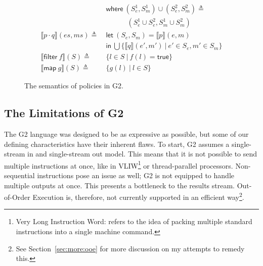 \documentclass[sigconf,usenames,dvipsnames,svgnames,table]{acmart}
\newcommand{\interp}[1]{\llbracket #1 \rrbracket}
\def \sysname {\textsc{G2}\xspace}
\begin{document}
\begin{figure}
{\begin{align*}
              &\mathsf{where}\ (S_e^1, S_m^1)\cup (S_e^2, S_m^2)\triangleq\\
              &\quad\quad\quad (S_e^1\cup S_e^2, S_m^1\cup S_m^2)\\
            \interp { p \cdot q }(es, ms)
              \triangleq\ &
              \mathsf{let}\ (S_e, S_m) = \interp{p}(e, m)\\
              &\mathsf{in}\ \bigcup \{\interp{q}(e',m')\ |\ e'\in S_e, m'\in S_m\}\\
              \hline
            \interp{\mathsf{filter}\ f}(S)
              \triangleq\ & \{l \in S\ |\ f(l) = \mathsf{true}\}\\
            \interp{\mathsf{map}\ g}(S)
              \triangleq\ &
              \{ g(l)\ |\ l\in S \} 
          \end{align*}}
          \caption{The semantics of policies in \sysname.}
          \label{fig:spec:sem:pol}
        \end{figure}

    \subsection{The Limitations of \sysname}\label{sec:spec:lim}
      The \sysname language was designed to be as expressive as possible, but some of our defining characteristics have their inherent flaws.
      To start, \sysname assumes a single-stream in and single-stream out model.
      This means that it is not possible to send multiple instructions at once, like in VLIW\footnote{
      Very Long Instruction Word: refers to the idea of packing multiple standard instructions into a single machine command.} or thread-parallel processors.
      Non-sequential instructions pose an issue as well; \sysname is not equipped to handle multiple outputs at once.
      This presents a bottleneck to the results stream.
      Out-of-Order Execution is, therefore, not currently supported in an efficient way\footnote{See Section~\ref{sec:more:ooe} for more discussion on my attempts to remedy this.}.
      \par
\end{document}
